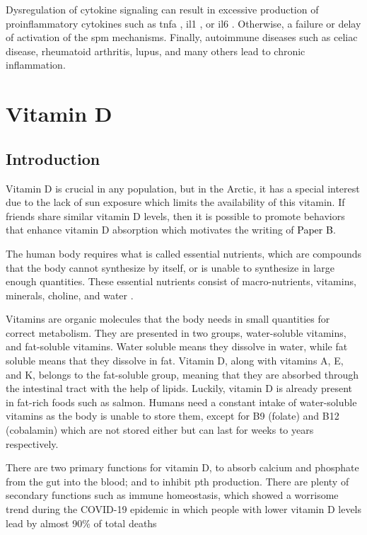 Dysregulation of cytokine signaling can result in excessive production of pro\hyph inflammatory cytokines such as \gls{tnfa} \cite{Li2019}, \gls{il1} \cite{Nouri1984-bv}, or \gls{il6} \cite{Aliyu2022}. Otherwise, a failure or delay of activation of the \gls{spm} mechanisms. Finally, autoimmune diseases such as celiac disease, rheumatoid arthritis, lupus, and many others lead to chronic inflammation.


\section{Vitamin D}

\subsection{Introduction}

Vitamin D is crucial in any population, but in the Arctic, it has a special interest due to the lack of sun exposure which limits the availability of this vitamin. If friends share similar vitamin D levels, then it is possible to promote behaviors that enhance vitamin D absorption which motivates the writing of \colorbox{PaperColor}{\textcolor{black}{Paper B}}.


The human body requires what is called essential nutrients, which are compounds that the body cannot synthesize by itself, or is unable to synthesize in large enough quantities. These essential nutrients consist of macro-nutrients, vitamins, minerals, choline, and water \cite{Morris2023-ui}.

Vitamins are organic molecules that the body needs in small quantities for correct metabolism. They are presented in two groups, water-soluble vitamins, and fat-soluble vitamins. Water soluble means they dissolve in water, while fat soluble means that they dissolve in fat. Vitamin D, along with vitamins A, E, and K, belongs to the fat-soluble group, meaning that they are absorbed through the intestinal tract with the help of lipids. Luckily, vitamin D is already present in fat-rich foods such as salmon. Humans need a constant intake of water-soluble vitamins as the body is unable to store them, except for B9 (folate) and B12 (cobalamin) which are not stored either but can last for weeks to years respectively.

There are two primary functions for vitamin D, to absorb calcium and phosphate from the gut into the blood; and to inhibit \gls{pth} production. There are plenty of secondary functions such as immune homeostasis, which showed a worrisome trend during the COVID-19 epidemic in which people with lower vitamin D levels lead by almost 90\% of total deaths \cite{Brenner2020, Dissanayake2021}

